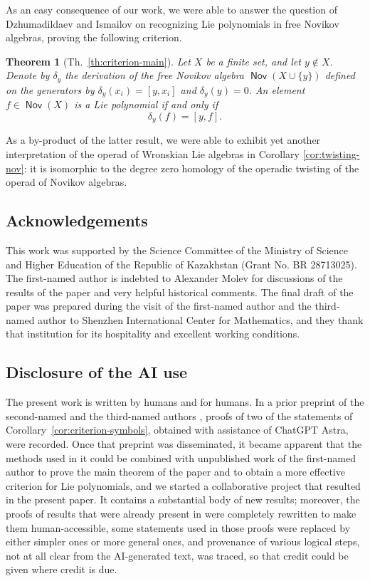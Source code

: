 \documentclass[11pt,reqno]{amsart}
\theoremstyle{plain}
\newtheorem*{itheorem}{Theorem}
\theoremstyle{definition}
\theoremstyle{remark}
\DeclareMathOperator{\Nov}{\mathsf{Nov}}
\begin{document}
As an easy consequence of our work, we were able to answer the question of Dzhumadildaev and Ismailov \cite{DI14} on recognizing Lie polynomials in free Novikov algebras, proving the following criterion. 

\begin{itheorem}[{Th.~\ref{th:criterion-main}}]
Let $X$ be a finite set, and let $y\notin X$. Denote by $\delta_y$ the derivation of the free Novikov algebra $\Nov(X\cup\{y\})$ defined on the generators by $\delta_y(x_i)=[y,x_i]$ and $\delta_y(y)=0$. An element  $f\in\Nov(X)$ is a Lie polynomial if and only if
\begin{equation*}
\delta_y(f)=[y,f].    
\end{equation*}
\end{itheorem}

As a by-product of the latter result, we were able to exhibit yet another interpretation of the operad of Wronskian Lie algebras in Corollary \ref{cor:twisting-nov}: it is isomorphic to the degree zero homology of the operadic twisting \cite{MR4621635} of the operad of Novikov algebras.

\subsection*{Acknowledgements} This work was supported by the Science Committee of the Ministry of Science and Higher Education of the Republic of Kazakhstan (Grant No. BR 28713025). The first-named author is indebted to Alexander Molev for discussions of the results of the paper and very helpful historical comments. The final draft of the paper was prepared during the visit of the first-named author and the third-named author to Shenzhen International Center for Mathematics, and they thank that institution for its hospitality and excellent working conditions.

\subsection*{Disclosure of the AI use}
The present work is written by humans and for humans. In a prior preprint of the second-named and the third-named authors \cite{MS2026}, proofs of two of the statements of Corollary~\ref{cor:criterion-symbols}, obtained with assistance of ChatGPT Astra, were recorded. Once that preprint was disseminated, it became apparent that the methods used in it could be combined with unpublished work of the first-named author to prove the main theorem of the paper and to obtain a more effective criterion for Lie polynomials, and we started a collaborative project that resulted in the present paper. It contains a substantial body of new results; moreover, the proofs of results that were already present in \cite{MS2026} were completely rewritten to make them human-accessible, some statements used in those proofs were replaced by either simpler ones or more general ones, and provenance of various logical steps, not at all clear from the AI-generated text, was traced, so that credit could be given where credit is due. 
\end{document}
